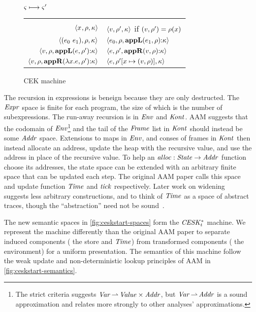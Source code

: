 \begin{figure}
  \centering
  $\varsigma \longmapsto \varsigma'$ \\
  \begin{tabular}{r|l}
    \hline\vspace{-3mm}\\
    $\langle x^{{}}, \rho, \kappa \rangle$
    &
    $\langle v, \rho', \kappa \rangle$ if $(v,\rho') = \rho(x)$
    \\
    $\langle (e_{0}\ e_{1}){},\rho,\kappa \rangle$
    &
    $\langle e_{0},\rho,\mathbf{appL}(e_{1},\rho){\tt :} \kappa \rangle$
    \\
    $\langle v,\rho, \mathbf{appL}(e,\rho'){\tt :} \kappa \rangle$
    &
    $\langle e,\rho',\mathbf{appR}(v,\rho){\tt :} \kappa \rangle$
    \\
    $\langle v,\rho,\mathbf{appR}(\lambda{} x. e,\rho'){\tt :} \kappa \rangle$
    &
    $\langle e,\rho'[x\mapsto(v,\rho)],\kappa \rangle$
  \end{tabular}
  \caption{CEK machine}
  \label{fig:cek-semantics}
\end{figure}

The recursion in expressions is beneign because they are only destructed. The $\mathit{Expr}$ space is finite for each program, the size of which is the number of subexpressions.
%
The run-away recursion is in $\mathit{Env}$ and $\mathit{Kont}$.
%
AAM suggests that the codomain of $\mathit{Env}$\footnote{The strict criteria suggests $\mathit{Var} \operatorname*{\rightharpoonup} \mathit{Value} \times \mathit{Addr}$, but $\mathit{Var} \operatorname*{\rightharpoonup} \mathit{Addr}$ is a sound approximation and relates more strongly to other analyses' approximations.} and the tail of the $\mathit{Frame}$ list in $\mathit{Kont}$ should instead be some $\mathit{Addr}$ space.
%
Extensions to maps in $\mathit{Env}$, and conses of frames in $\mathit{Kont}$ then instead allocate an address, update the heap with the recursive value, and use the address in place of the recursive value.
%
To help an $\mathit{alloc} : \mathit{State} \to \mathit{Addr}$ function choose its addresses, the state space can be extended with an arbitrary finite space that can be updated each step.
%
The original AAM paper calls this space and update function $\mathit{Time}$ and $\mathit{tick}$ respectively.
%
Later work on widening~\citep{ianjohnson:DBLP:conf/vmcai/HardekopfWCK14} suggests less arbitrary constructions, and to think of $\mathit{Time}$ as a space of abstract traces, though the ``abstraction'' need not be sound~\citep{dvanhorn:Might2009Posteriori}.

The new semantic spaces in \autoref{fig:ceskstart-spaces} form the $\mathit{CESK^*_t}$ machine.
%
We represent the machine differently than the original AAM paper to separate induced components (\eg{} the store and $\mathit{Time}$) from transformed components (\eg{} the environment) for a uniform presentation.
%
The semantics of this machine follow the weak update and non-deterministic lookup principles of AAM in \autoref{fig:ceskstart-semantics}.

